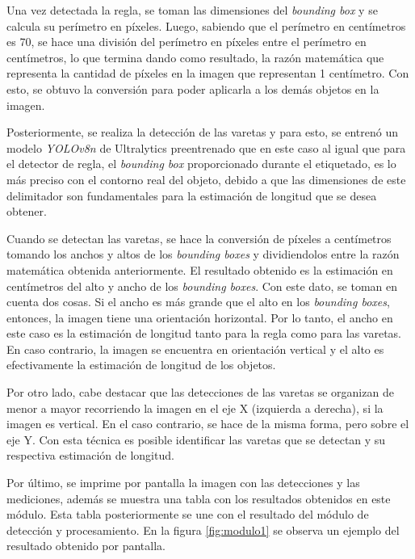 Una vez detectada la regla, se toman las dimensiones del \textit{bounding box} y se calcula su perímetro en píxeles. Luego, sabiendo que el perímetro en centímetros es 70, se hace una división del perímetro en píxeles entre el perímetro en centímetros, lo que termina dando como resultado, la razón matemática que representa la cantidad de píxeles en la imagen que representan 1 centímetro. Con esto, se obtuvo la conversión para poder aplicarla a los demás objetos en la imagen.

Posteriormente, se realiza la detección de las varetas y para esto, se entrenó un modelo \textit{YOLOv8n} de Ultralytics preentrenado que en este caso al igual que para el detector de regla, el \textit{bounding box} proporcionado durante el etiquetado, es lo más preciso con el contorno real del objeto, debido a que las dimensiones de este delimitador son fundamentales para la estimación de longitud que se desea obtener. 

Cuando se detectan las varetas, se hace la conversión de píxeles a centímetros tomando los anchos y altos de los \textit{bounding boxes} y dividiendolos entre la razón matemática obtenida anteriormente. El resultado obtenido es la estimación en centímetros del alto y ancho de los \textit{bounding boxes}. Con este dato, se toman en cuenta dos cosas. Si el ancho es más grande que el alto en los \textit{bounding boxes}, entonces, la imagen tiene una orientación horizontal. Por lo tanto, el ancho en este caso es la estimación de longitud tanto para la regla como para las varetas. En caso contrario, la imagen se encuentra en orientación vertical y el alto es efectivamente la estimación de longitud de los objetos.

Por otro lado, cabe destacar que las detecciones de las varetas se organizan de menor a mayor recorriendo la imagen en el eje X (izquierda a derecha), si la imagen es vertical. En el caso contrario, se hace de la misma forma, pero sobre el eje Y. Con esta técnica es posible identificar las varetas que se detectan y su respectiva estimación de longitud.

Por último, se imprime por pantalla la imagen con las detecciones y las mediciones, además se muestra una tabla con los resultados obtenidos en este módulo. Esta tabla posteriormente se une con el resultado del módulo de detección y procesamiento. En la figura \ref{fig:modulo1} se observa un ejemplo del resultado obtenido por pantalla.


